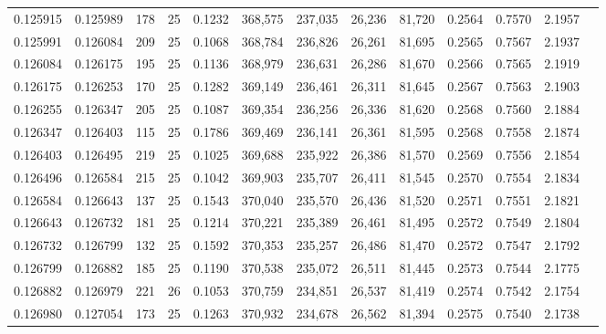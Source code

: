 \begin{tabular}{rrrrrrrrrrrrr}
0.125915 & 0.125989 &   178 &  25 &                                     0.1232 & 368,575 & 237,035 &  26,236 &  81,720 & 0.2564 & 0.7570 & 2.1957 \\
0.125991 & 0.126084 &   209 &  25 &                                     0.1068 & 368,784 & 236,826 &  26,261 &  81,695 & 0.2565 & 0.7567 & 2.1937 \\
0.126084 & 0.126175 &   195 &  25 &                                     0.1136 & 368,979 & 236,631 &  26,286 &  81,670 & 0.2566 & 0.7565 & 2.1919 \\
0.126175 & 0.126253 &   170 &  25 &                                     0.1282 & 369,149 & 236,461 &  26,311 &  81,645 & 0.2567 & 0.7563 & 2.1903 \\
0.126255 & 0.126347 &   205 &  25 &                                     0.1087 & 369,354 & 236,256 &  26,336 &  81,620 & 0.2568 & 0.7560 & 2.1884 \\
0.126347 & 0.126403 &   115 &  25 &                                     0.1786 & 369,469 & 236,141 &  26,361 &  81,595 & 0.2568 & 0.7558 & 2.1874 \\
0.126403 & 0.126495 &   219 &  25 &                                     0.1025 & 369,688 & 235,922 &  26,386 &  81,570 & 0.2569 & 0.7556 & 2.1854 \\
0.126496 & 0.126584 &   215 &  25 &                                     0.1042 & 369,903 & 235,707 &  26,411 &  81,545 & 0.2570 & 0.7554 & 2.1834 \\
0.126584 & 0.126643 &   137 &  25 &                                     0.1543 & 370,040 & 235,570 &  26,436 &  81,520 & 0.2571 & 0.7551 & 2.1821 \\
0.126643 & 0.126732 &   181 &  25 &                                     0.1214 & 370,221 & 235,389 &  26,461 &  81,495 & 0.2572 & 0.7549 & 2.1804 \\
0.126732 & 0.126799 &   132 &  25 &                                     0.1592 & 370,353 & 235,257 &  26,486 &  81,470 & 0.2572 & 0.7547 & 2.1792 \\
0.126799 & 0.126882 &   185 &  25 &                                     0.1190 & 370,538 & 235,072 &  26,511 &  81,445 & 0.2573 & 0.7544 & 2.1775 \\
0.126882 & 0.126979 &   221 &  26 &                                     0.1053 & 370,759 & 234,851 &  26,537 &  81,419 & 0.2574 & 0.7542 & 2.1754 \\
0.126980 & 0.127054 &   173 &  25 &                                     0.1263 & 370,932 & 234,678 &  26,562 &  81,394 & 0.2575 & 0.7540 & 2.1738 \\

\end{tabular}
